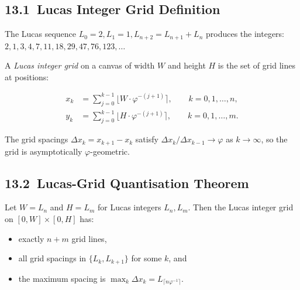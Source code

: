 \subsection{13.1\ Lucas Integer Grid
  Definition}\label{subsec:ch30-lucas-grid-def}

The Lucas sequence $L_0 = 2, L_1 = 1,
L_{n+2} = L_{n+1} + L_n$ produces the integers:
$2, 1, 3, 4, 7, 11, 18, 29, 47, 76, 123, \ldots$

A \emph{Lucas integer grid} on a canvas of width
$W$ and height $H$ is the set of grid lines at
positions:

\begin{align*}
  x_k &= \sum_{j=0}^{k-1} \lfloor
    W \cdot \varphi^{-(j+1)} \rceil,
    \qquad k = 0, 1, \ldots, n, \\
  y_k &= \sum_{j=0}^{k-1} \lfloor
    H \cdot \varphi^{-(j+1)} \rceil,
    \qquad k = 0, 1, \ldots, m.
\end{align*}

The grid spacings $\Delta x_k = x_{k+1} - x_k$
satisfy $\Delta x_k / \Delta x_{k-1}
\to \varphi$ as $k \to \infty$, so the grid is
asymptotically $\varphi$-geometric.

\subsection{13.2\ Lucas-Grid Quantisation
  Theorem}\label{subsec:ch30-lucas-quant}

\begin{theorem}
\label{thm:ch30-lucas-coverage}
Let $W = L_n$ and $H = L_m$ for Lucas integers
$L_n, L_m$.  Then the Lucas integer grid on
$[0, W] \times [0, H]$ has:
\begin{itemize}
  \item exactly $n + m$ grid lines,
  \item all grid spacings in $\{L_k, L_{k+1}\}$
    for some $k$, and
  \item the maximum spacing is
    $\max_k \Delta x_k = L_{\lceil n\varphi^{-1} \rceil}$.
\end{itemize}
\end{theorem}


